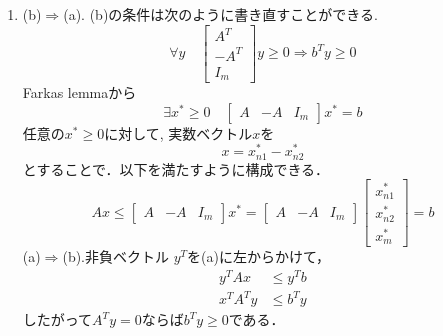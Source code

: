 \begin{enumerate}

\item (b)$\Rightarrow$(a).
(b)の条件は次のように書き直すことができる.
\begin{equation}
    \forall y \quad \begin{bmatrix}
    A^T \\
    -A^T\\
    I_m
    \end{bmatrix}
    y \geq 0
    \Rightarrow
    b^T y \geq 0
\end{equation}
Farkas lemmaから
\begin{equation}
    \exists x^\ast \geq 0 \quad 
     \begin{bmatrix}
    A &
    -A &
    I_m
    \end{bmatrix}x^\ast  = b
\end{equation}
任意の$x^\ast \geq 0$に対して,
実数ベクトル$x$を
\begin{equation}
    x =x^\ast_{n1} -  x^\ast_{n2}
\end{equation}
とすることで．以下を満たすように構成できる．
\begin{equation}
    Ax \leq  \begin{bmatrix}
    A &
    -A &
    I_m
    \end{bmatrix}x^\ast 
    =\begin{bmatrix}
    A &
    -A &
    I_m
    \end{bmatrix}
    \begin{bmatrix}
    x^\ast_{n1}\\
    x^\ast_{n2}\\
    x^\ast_m
    \end{bmatrix}
    = b
\end{equation}
(a)$\Rightarrow$(b).非負ベクトル
$y^T$を(a)に左からかけて，
\begin{align}
    y^T Ax &\leq y^T b\\
    x^T A^T y &\leq b^T y
\end{align}
したがって$A^Ty=0$ならば$ b^T y \geq 0$である．



\end{enumerate}
